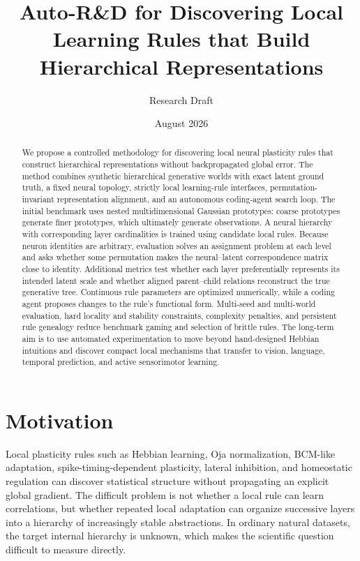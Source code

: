 \documentclass[11pt]{article}
\title{Auto-R\&D for Discovering Local Learning Rules that Build Hierarchical Representations}
\author{Research Draft}
\date{August 2026}
\begin{document}
\maketitle

\begin{abstract}
We propose a controlled methodology for discovering local neural plasticity rules that construct hierarchical representations without backpropagated global error. The method combines synthetic hierarchical generative worlds with exact latent ground truth, a fixed neural topology, strictly local learning-rule interfaces, permutation-invariant representation alignment, and an autonomous coding-agent search loop. The initial benchmark uses nested multidimensional Gaussian prototypes: coarse prototypes generate finer prototypes, which ultimately generate observations. A neural hierarchy with corresponding layer cardinalities is trained using candidate local rules. Because neuron identities are arbitrary, evaluation solves an assignment problem at each level and asks whether some permutation makes the neural--latent correspondence matrix close to identity. Additional metrics test whether each layer preferentially represents its intended latent scale and whether aligned parent--child relations reconstruct the true generative tree. Continuous rule parameters are optimized numerically, while a coding agent proposes changes to the rule's functional form. Multi-seed and multi-world evaluation, hard locality and stability constraints, complexity penalties, and persistent rule genealogy reduce benchmark gaming and selection of brittle rules. The long-term aim is to use automated experimentation to move beyond hand-designed Hebbian intuitions and discover compact local mechanisms that transfer to vision, language, temporal prediction, and active sensorimotor learning.
\end{abstract}

\section{Motivation}
Local plasticity rules such as Hebbian learning, Oja normalization, BCM-like adaptation, spike-timing-dependent plasticity, lateral inhibition, and homeostatic regulation can discover statistical structure without propagating an explicit global gradient. The difficult problem is not whether a local rule can learn correlations, but whether repeated local adaptation can organize successive layers into a hierarchy of increasingly stable abstractions. In ordinary natural datasets, the target internal hierarchy is unknown, which makes the scientific question difficult to measure directly.
\end{document}
